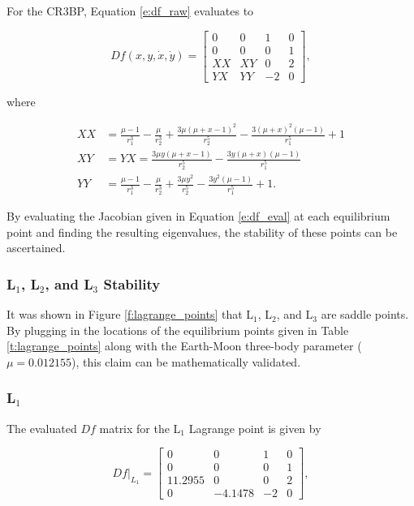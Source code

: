 \documentclass[11pt]{article} %
\begin{document}
\noindent 
For the CR3BP, Equation \ref{e:df_raw} evaluates to 

\doublespacing
\begin{equation}
	\label{e:df_eval}
	Df\left(x,y,\dot{x},\dot{y}\right) = 
	\begin{bmatrix} 
		0 & 0 & 1  & 0 \\ 
		0 & 0 & 0 & 1 \\
		XX & XY & 0 & 2 \\
		YX & YY & -2 & 0
	\end{bmatrix},
\end{equation}
\singlespacing

\noindent
where

\begin{align}
	XX &= \frac{\mu - 1}{r_1^3} - \frac{\mu}{r_2^3} + \frac{3\mu\left(\mu+x-1\right)^2}{r_2^5} - \frac{3\left(\mu+x\right)^2\left(\mu-1\right)}{r_1^5} + 1 \\
	XY &= YX = \frac{3\mu y\left(\mu+x-1\right)}{r_2^5} - \frac{3y\left(\mu+x\right)\left(\mu-1\right)}{r_1^5} \\
	YY &= \frac{\mu - 1}{r_1^3} - \frac{\mu}{r_2^3} + \frac{3\mu y^2}{r_2^5} - \frac{3y^2\left(\mu-1\right)}{r_1^5} + 1.
\end{align}

\noindent
By evaluating the Jacobian given in Equation \ref{e:df_eval} at each equilibrium point and finding the resulting eigenvalues, the stability of these points can be ascertained.

\subsubsection{L$_1$, L$_2$, and L$_3$ Stability}
It was shown in Figure \ref{f:lagrange_points} that L$_1$, L$_2$, and L$_3$ are saddle points. By plugging in the locations of the equilibrium points given in Table \ref{t:lagrange_points} along with the Earth-Moon three-body parameter ($\mu = 0.012155$), this claim can be mathematically validated. 

\subsubsection*{L$_1$}
The evaluated $Df$ matrix for the L$_1$ Lagrange point is given by

\doublespacing
\begin{equation}
	\label{e:df_eval_L1}
	Df|_{L_1} = 
	\begin{bmatrix} 
		0 & 0 & 1  & 0 \\ 
		0 & 0 & 0 & 1 \\
		11.2955 & 0 & 0 & 2 \\
		0 & -4.1478 & -2 & 0
	\end{bmatrix},
\end{equation}
\singlespacing
\end{document}
